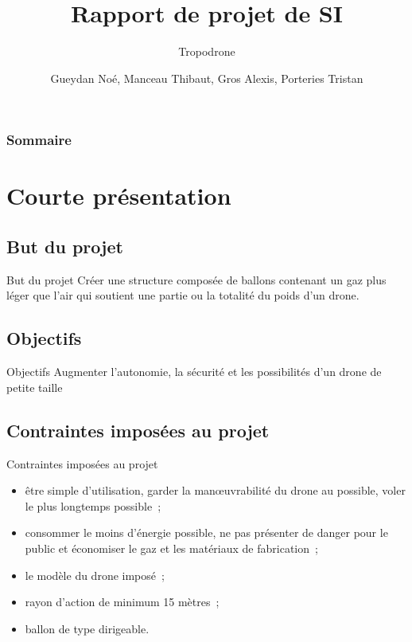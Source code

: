\documentclass{beamer}
\title{Rapport de projet de SI}
\subtitle{Tropodrone}
\author{Gueydan Noé, Manceau Thibaut, Gros Alexis, Porteries Tristan}
\begin{document}
\begin{frame}
  \titlepage
\end{frame}

\begin{frame}
    \frametitle{Sommaire}
    \begin{multicols}{2}
      {
		\setcounter{tocdepth}{1}
        \tableofcontents
      }
    \end{multicols}
\end{frame}

\section{Courte présentation}

\subsection{But du projet}
\begin{frame}{But du projet}
 Créer une structure composée de ballons contenant un gaz plus léger que l’air qui soutient une partie ou la totalité du poids d'un drone.
\end{frame}


\subsection{Objectifs}
\begin{frame}{Objectifs}
 Augmenter l’autonomie, la sécurité et les possibilités d’un drone de petite taille
\end{frame}


\subsection{Contraintes imposées au projet}
\begin{frame}{Contraintes imposées au projet}
  \begin{itemize}
    \item être simple d’utilisation, garder la manœuvrabilité du drone au possible, voler le plus longtemps possible~;
    \item consommer le moins d’énergie possible, ne pas présenter de danger pour le public et économiser le gaz et les matériaux de fabrication~;
    \item le modèle du drone imposé~;
    \item rayon d’action de minimum 15 mètres~;
    \item ballon de type dirigeable.
  \end{itemize}
\end{frame}
\end{document}
